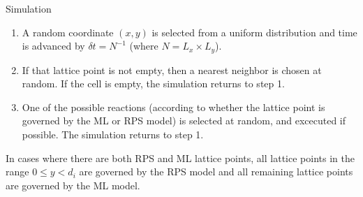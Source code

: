 \documentclass{beamer}
\begin{document}
\begin{frame}{}
\begin{textblock}{0.32}
\begin{block}{Simulation}
        \begin{enumerate}
            \item A random coordinate $(x, y)$ is selected from a uniform distribution
                and time is advanced by $\delta t = N^{-1} $ (where $N = L_x \times L_y$).
            \item If that lattice point is not empty, then a nearest neighbor is chosen
                at random. If the cell is empty, the simulation returns to step 1.
            \item One of the possible reactions (according to whether the lattice point
                is governed by the ML or RPS model) is selected at random, and excecuted
                if possible. The simulation returns to step 1.
        \end{enumerate}

        In cases where there are both RPS and ML lattice points, all lattice points
        in the range $0 \leq y < d_i$ are governed by the RPS model and all 
        remaining lattice points are governed by the ML model.
    \end{block}
\end{textblock}


\end{frame}
\end{document}
